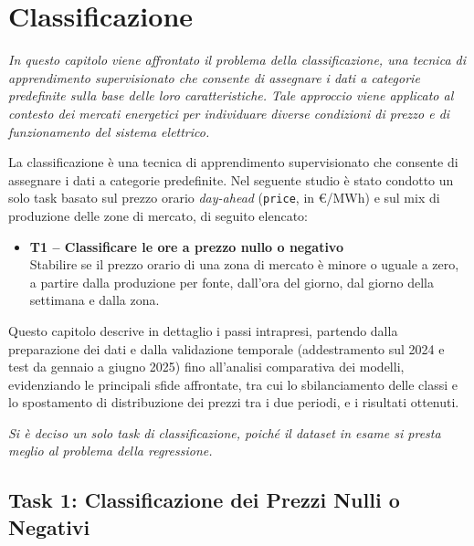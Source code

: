 \chapter{Classificazione} %

\begin{preamble}
{\em In questo capitolo viene affrontato il problema della classificazione, una tecnica di apprendimento supervisionato che consente di assegnare i dati a categorie predefinite sulla base delle loro caratteristiche. Tale approccio viene applicato al contesto dei mercati energetici per individuare diverse condizioni di prezzo e di funzionamento del sistema elettrico.}
\end{preamble}


La classificazione è una tecnica di apprendimento supervisionato che consente di assegnare i dati a categorie predefinite. Nel seguente studio è stato condotto un solo task basato sul prezzo orario \textit{day-ahead} (\texttt{price}, in \euro/MWh) e sul mix di produzione delle zone di mercato, di seguito elencato: 
\begin{itemize}
    \item \textbf{T1 -- Classificare le ore a prezzo nullo o negativo}\\
    Stabilire se il prezzo orario di una zona di mercato è minore o uguale a zero, a partire dalla produzione per fonte, dall'ora del giorno, dal giorno della settimana e dalla zona.
\end{itemize}
Questo capitolo descrive in dettaglio i passi intrapresi, partendo dalla preparazione dei dati e dalla validazione temporale (addestramento sul 2024 e test da gennaio a giugno 2025) fino all'analisi comparativa dei modelli, evidenziando le principali sfide affrontate, tra cui lo sbilanciamento delle classi e lo spostamento di distribuzione dei prezzi tra i due periodi, e i risultati ottenuti.

\begin{center}
\colorbox{gray!15}{%
  \parbox{\dimexpr\linewidth-2\fboxsep}{%
    \textit{Si è deciso un solo task di classificazione, poiché il dataset in esame si presta meglio al problema della regressione.}
  }%
}
\end{center}

\section{Task 1: Classificazione dei Prezzi Nulli o Negativi}
\label{sec:task1_descrizione}

